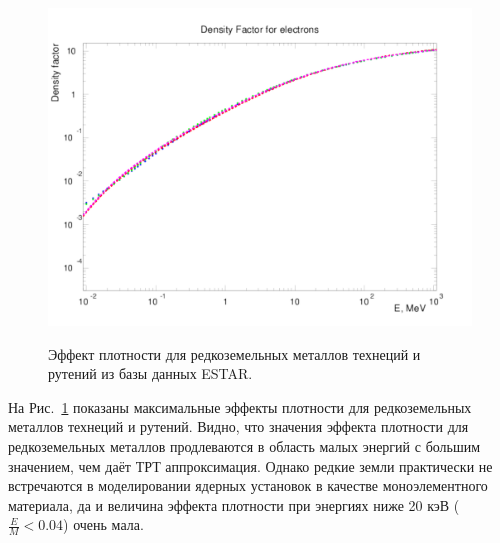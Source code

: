 \documentclass[a4paper,12pt]{article}
\begin{document}
\begin{large}
  \begin{figure}[ht]
    {
       \includegraphics[width=0.99\linewidth]{images/denf_rearth}
    }
    \caption{Эффект плотности для редкоземельных металлов технеций и рутений из базы данных ESTAR.}
    \label{fig:denf_rearth}
  \end{figure}
  На Рис.~\ref{fig:denf_rearth} показаны максимальные эффекты плотности для редкоземельных металлов технеций и рутений.
  Видно, что значения эффекта плотности для редкоземельных металлов продлеваются в область малых энергий с большим значением, чем даёт ТРТ аппроксимация.
  Однако редкие земли практически не встречаются в моделировании ядерных установок в качестве моноэлементного материала, да и величина эффекта плотности при энергиях ниже 20 кэВ ($\frac{E}{M}<0.04$) очень мала.


\end{large}
\end{document}
